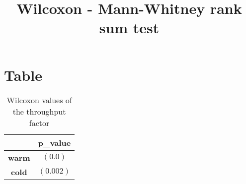 \documentclass{article}
\title{Wilcoxon - Mann-Whitney rank sum test}
\author{}
\begin{document}
\maketitle
\section{Table}
\begin{table}[!htp]
  \caption{Wilcoxon values of the throughput factor}
  \label{table:throughput}
  \centering
  \begin{scriptsize}
  \begin{tabular}{c|c}
      & \textbf{p\_value} \\\hline
      \textbf{warm} & $(0.0)$ \\
      \textbf{cold} & $(0.002)$ \\
  \end{tabular}
  \end{scriptsize}
\end{table}
\end{document}
